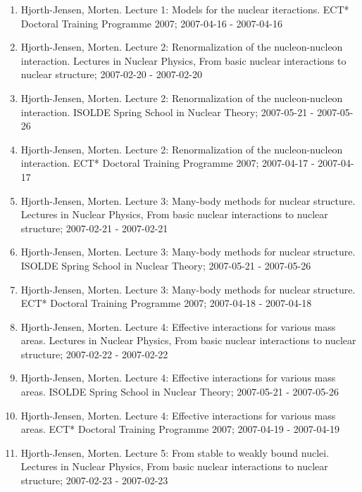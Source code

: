 \documentclass[%
oneside,                 %
final,                   %
10pt]{article}
\begin{document}
\begin{enumerate}
\item Hjorth-Jensen, Morten.  Lecture 1: Models for the nuclear iteractions. ECT* Doctoral Training Programme 2007; 2007-04-16 - 2007-04-16

\item Hjorth-Jensen, Morten.  Lecture 2: Renormalization of the nucleon-nucleon interaction. Lectures in Nuclear Physics, From basic nuclear interactions to nuclear structure; 2007-02-20 - 2007-02-20

\item Hjorth-Jensen, Morten.  Lecture 2: Renormalization of the nucleon-nucleon interaction. ISOLDE Spring School in Nuclear Theory; 2007-05-21 - 2007-05-26

\item Hjorth-Jensen, Morten.  Lecture 2: Renormalization of the nucleon-nucleon interaction. ECT* Doctoral Training Programme 2007; 2007-04-17 - 2007-04-17

\item Hjorth-Jensen, Morten.  Lecture 3: Many-body methods for nuclear structure. Lectures in Nuclear Physics, From basic nuclear interactions to nuclear structure; 2007-02-21 - 2007-02-21

\item Hjorth-Jensen, Morten.  Lecture 3: Many-body methods for nuclear structure. ISOLDE Spring School in Nuclear Theory; 2007-05-21 - 2007-05-26

\item Hjorth-Jensen, Morten.  Lecture 3: Many-body methods for nuclear structure. ECT* Doctoral Training Programme 2007; 2007-04-18 - 2007-04-18

\item Hjorth-Jensen, Morten.  Lecture 4: Effective interactions for various mass areas. Lectures in Nuclear Physics, From basic nuclear interactions to nuclear structure; 2007-02-22 - 2007-02-22

\item Hjorth-Jensen, Morten.  Lecture 4: Effective interactions for various mass areas. ISOLDE Spring School in Nuclear Theory; 2007-05-21 - 2007-05-26

\item Hjorth-Jensen, Morten.  Lecture 4: Effective interactions for various mass areas. ECT* Doctoral Training Programme 2007; 2007-04-19 - 2007-04-19

\item Hjorth-Jensen, Morten.  Lecture 5: From stable to weakly bound nuclei. Lectures in Nuclear Physics, From basic nuclear interactions to nuclear structure; 2007-02-23 - 2007-02-23


\end{enumerate}
\end{document}
